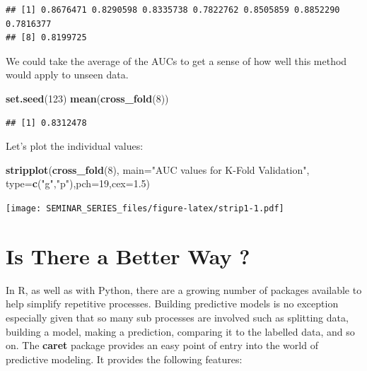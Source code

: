 \documentclass[]{book}
\newenvironment{Shaded}{\begin{snugshade}}{\end{snugshade}}
\newcommand{\KeywordTok}[1]{\textcolor[rgb]{0.13,0.29,0.53}{\textbf{#1}}}
\newcommand{\DataTypeTok}[1]{\textcolor[rgb]{0.13,0.29,0.53}{#1}}
\newcommand{\DecValTok}[1]{\textcolor[rgb]{0.00,0.00,0.81}{#1}}
\newcommand{\FloatTok}[1]{\textcolor[rgb]{0.00,0.00,0.81}{#1}}
\newcommand{\StringTok}[1]{\textcolor[rgb]{0.31,0.60,0.02}{#1}}
\newcommand{\NormalTok}[1]{#1}
\begin{document}
\begin{verbatim}
## [1] 0.8676471 0.8290598 0.8335738 0.7822762 0.8505859 0.8852290 0.7816377
## [8] 0.8199725
\end{verbatim}

We could take the average of the AUCs to get a sense of how well this
method would apply to unseen data.

\begin{Shaded}
\begin{Highlighting}[]
\KeywordTok{set.seed}\NormalTok{(}\DecValTok{123}\NormalTok{)}
\KeywordTok{mean}\NormalTok{(}\KeywordTok{cross_fold}\NormalTok{(}\DecValTok{8}\NormalTok{))}
\end{Highlighting}
\end{Shaded}

\begin{verbatim}
## [1] 0.8312478
\end{verbatim}

Let's plot the individual values:

\begin{Shaded}
\begin{Highlighting}[]
\KeywordTok{stripplot}\NormalTok{(}\KeywordTok{cross_fold}\NormalTok{(}\DecValTok{8}\NormalTok{),}
          \DataTypeTok{main=}\StringTok{"AUC values for K-Fold Validation"}\NormalTok{,}
          \DataTypeTok{type=}\KeywordTok{c}\NormalTok{(}\StringTok{"g"}\NormalTok{,}\StringTok{"p"}\NormalTok{),}\DataTypeTok{pch=}\DecValTok{19}\NormalTok{,}\DataTypeTok{cex=}\FloatTok{1.5}\NormalTok{)}
\end{Highlighting}
\end{Shaded}

\texttt{[image: SEMINAR\_SERIES\_files/figure-latex/strip1-1.pdf]}

\chapter{Is There a Better Way ?}\label{is-there-a-better-way}

In R, as well as with Python, there are a growing number of packages
available to help simplify repetitive processes. Building predictive
models is no exception especially given that so many sub processes are
involved such as splitting data, building a model, making a prediction,
comparing it to the labelled data, and so on. The \textbf{caret} package
provides an easy point of entry into the world of predictive modeling.
It provides the following features:
\end{document}
